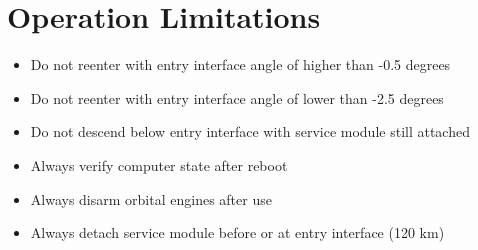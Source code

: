 \section{Operation Limitations}
\begin{itemize}
  \item Do not reenter with entry interface angle of higher than -0.5 degrees
  \item Do not reenter with entry interface angle of lower than -2.5 degrees
  \item Do not descend below entry interface with service module still attached
  \item Always verify computer state after reboot
  \item Always disarm orbital engines after use
  \item Always detach service module before or at entry interface (120 km)
\end{itemize}


\onecolumn